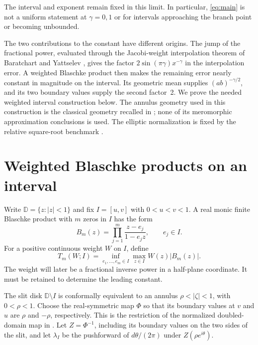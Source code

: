 \documentclass[11pt]{article}
\newcommand{\D}{\mathbb D}
\begin{document}
The interval and exponent remain fixed in this limit. In particular,
\eqref{eq:main} is not a uniform statement at $\gamma=0,1$ or for intervals
approaching the branch point or becoming unbounded.

The two contributions to the constant have different origins.
The jump of the fractional power, evaluated through the Jacobi-weight
interpolation theorem of Baratchart and Yattselev \cite{BY}, gives the factor
$2\sin(\pi\gamma)x^{-\gamma}$ in the interpolation error.
A weighted Blaschke product then makes the remaining error nearly constant
in magnitude on the interval. Its geometric mean supplies
$(ab)^{-\gamma/2}$, and its two boundary values supply the second factor~2.
We prove the needed weighted interval construction below. The annulus
geometry used in this construction is the classical geometry recalled in
\cite[Section~3]{BPS}; none of its meromorphic approximation conclusions is
used. The elliptic normalization is fixed by the relative square-root
benchmark \cite[Theorem~4.2]{BH}.

\section{Weighted Blaschke products on an interval}

Write $\D=\{z:|z|<1\}$ and fix $I=[u,v]$ with $0<u<v<1$.
A real monic finite Blaschke product with $m$ zeros in $I$ has the form
\begin{equation}\label{eq:blaschke}
 B_m(z)=\prod_{j=1}^m\frac{z-e_j}{1-e_jz},\qquad e_j\in I.
\end{equation}
For a positive continuous weight $W$ on $I$, define
\[
 T_m(W;I)=\inf_{e_1,\ldots,e_m\in I}\max_{z\in I}W(z)|B_m(z)|.
\]
The weight will later be a fractional inverse power in a half-plane
coordinate. It must be retained to determine the leading constant.

The slit disk $\D\setminus I$ is conformally equivalent to an annulus
$\rho<|\zeta|<1$, with $0<\rho<1$. Choose the real-symmetric map
$\Phi$ so that its boundary values at $v$ and $u$ are $\rho$ and $-\rho$,
respectively. This is the restriction of the normalized doubled-domain
map in \cite[Section~3]{BPS}. Let $Z=\Phi^{-1}$, including its boundary
values on the two sides of the slit, and let $\lambda_I$ be the pushforward
of $d\theta/(2\pi)$ under $Z(\rho e^{i\theta})$.
\end{document}
